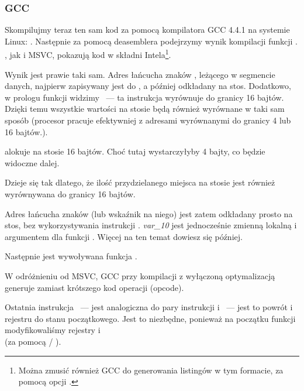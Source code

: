 \subsubsection{GCC}

Skompilujmy teraz ten sam kod za pomocą kompilatora GCC 4.4.1 na systemie Linux: .
Następnie za pomocą deasemblera \IDA podejrzymy wynik kompilacji funkcji \main.
\IDA, jak i MSVC, pokazują kod w składni Intela\footnote{Można zmusić również GCC do generowania listingów w tym formacie, za pomocą opcji .}.



Wynik jest prawie taki sam.
Adres łańcucha znaków , leżącego w segmencie danych, najpierw zapisywany jest do \EAX, a później odkładany na stos.
Dodatkowo, w prologu funkcji widzimy ~---
ta instrukcja wyrównuje \ESP do granicy 16 bajtów.
Dzięki temu wszystkie wartości na stosie będą również wyrównane w taki sam sposób (procesor pracuje efektywniej z adresami wyrównanymi do granicy 4 lub 16 bajtów.).

 alokuje na stosie 16 bajtów. Choć tutaj wystarczyłyby 4 bajty, co będzie widoczne dalej.

Dzieje się tak dlatego, że ilość przydzielanego miejsca na stosie jest również wyrównywana do granicy 16 bajtów.

Adres łańcucha znaków (lub wskaźnik na niego) jest zatem odkładany prosto na stos, bez wykorzystywania instrukcji \PUSH.
\emph{var\_10} jest jednocześnie zmienną lokalną i argumentem dla funkcji \printf{}.
Więcej na ten temat dowiesz się później.

Następnie jest wywoływana funkcja \printf.

W odróżnieniu od MSVC, GCC przy kompilacji z wyłączoną optymalizacją generuje  zamiast krótszego kod operacji (opcode).

Ostatnia instrukcja \LEAVE~--- jest analogiczna do pary instrukcji   i ~--- jest to powrót  i rejestru \EBP do stanu początkowego.
Jest to niezbędne, ponieważ na początku funkcji modyfikowaliśmy rejestry \ESP i \EBP\\
(za pomocą  / ).

